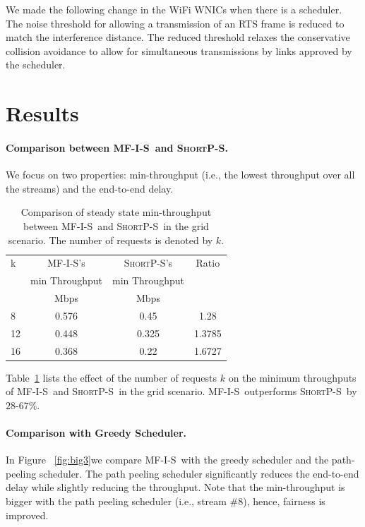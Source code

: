 \documentclass[12pt,oneside,english,a4paper]{book}
\theoremstyle{plain}
\theoremstyle{definition}
\theoremstyle{Theorem}
\theoremstyle{plain}
\newenvironment{proof sketch}[1]{\noindent {\emph{Proof sketch of #1:}}}{\hfill \qed}
\newcommand{\algA}{\textsc{MF-I-S}}
\newcommand{\algBS}{\textsc{ShortP-S}}
\begin{document}
We made the following change in the WiFi WNICs when there is a
scheduler. The noise threshold for allowing a transmission of an RTS
frame is reduced to match the interference distance. The reduced
threshold relaxes the conservative collision avoidance to allow for
simultaneous transmissions by links approved by the scheduler.

\section{Results}

\paragraph{Comparison between \algA\ and \algBS .}
We focus on two properties: min-throughput (i.e., the lowest throughput
over all the streams) and the end-to-end delay.
\begin{table}
\centering \scriptsize
\begin{tabular}{|| l || c | c | c ||}
\hline
k & \algA 's            & \algBS 's & Ratio\\
    &  min Throughput   & min Throughput & \\
\hline
& Mbps & Mbps & \\
\hline\hline
8 & 0.576 & 0.45  & 1.28  \\
12 & 0.448 & 0.325 & 1.3785 \\
16 & 0.368  & 0.22 & 1.6727 \\
\hline
\end{tabular}
\caption{Comparison of steady state min-throughput between \algA\ and \algBS\ in the
  grid scenario.  The number of requests is denoted by $k$. }
\label{tab:minthroughput}
\end{table}

Table~\ref{tab:minthroughput} lists the effect of the number of
requests $k$  on the minimum throughputs of \algA\ and \algBS\ in the
grid scenario.  \algA\ outperforms \algBS\ by $28$-$67\%$.

\paragraph{Comparison with Greedy Scheduler.}
In Figure%
~\ref{fig:big3}we compare \algA\ with the greedy scheduler
and the path-peeling scheduler.  The path peeling scheduler
significantly reduces the end-to-end delay while slightly reducing the
throughput. Note that the min-throughput is bigger with the
path peeling scheduler (i.e., stream \#8), hence, fairness is
improved.
\end{document}
